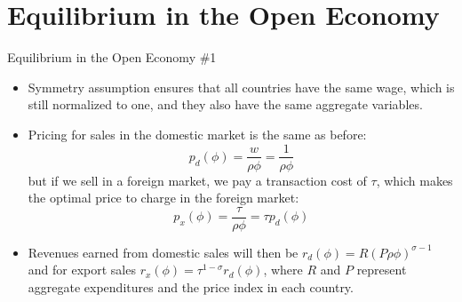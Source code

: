 \documentclass[aspectratio=169]{beamer}
\begin{document}

\section{Equilibrium in the Open Economy}


\begin{frame}{Equilibrium in the Open Economy \#1}

\begin{itemize}
    \item<1-> Symmetry assumption ensures that all countries have the same wage, which is still normalized to one, and they also have the same aggregate variables.
    \item<2-> Pricing for sales in the domestic market is the same as before:
    \begin{equation*}
        p_{d}\left( \phi \right) = \frac{w}{\rho \phi} = \frac{1}{\rho \phi}
    \end{equation*}
    but if we sell in a foreign market, we pay a transaction cost of $ \tau $, which makes the optimal price to charge in the foreign market:
    \begin{equation*}
        p_{x}\left( \phi \right) = \frac{\tau}{\rho \phi} = \tau p_{d}\left( \phi \right)
    \end{equation*}
    \item<3-> Revenues earned from domestic sales will then be $ r_{d}\left( \phi \right) = R\left( P \rho \phi \right)^{\sigma - 1} $ and for export sales $ r_{x}\left( \phi \right) = \tau^{1 - \sigma} r_{d}\left( \phi \right) $, where $ R $ and $ P $ represent aggregate expenditures and the price index in each country.
\end{itemize}
    
\end{frame}

\end{document}
